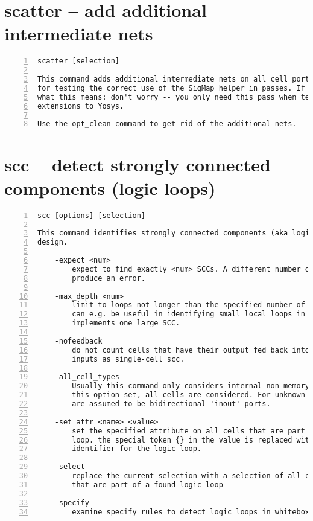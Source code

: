 \section{scatter -- add additional intermediate nets}
\label{cmd:scatter}
\begin{lstlisting}[numbers=left,frame=single]
    scatter [selection]

This command adds additional intermediate nets on all cell ports. This is used
for testing the correct use of the SigMap helper in passes. If you don't know
what this means: don't worry -- you only need this pass when testing your own
extensions to Yosys.

Use the opt_clean command to get rid of the additional nets.
\end{lstlisting}

\section{scc -- detect strongly connected components (logic loops)}
\label{cmd:scc}
\begin{lstlisting}[numbers=left,frame=single]
    scc [options] [selection]

This command identifies strongly connected components (aka logic loops) in the
design.

    -expect <num>
        expect to find exactly <num> SCCs. A different number of SCCs will
        produce an error.

    -max_depth <num>
        limit to loops not longer than the specified number of cells. This
        can e.g. be useful in identifying small local loops in a module that
        implements one large SCC.

    -nofeedback
        do not count cells that have their output fed back into one of their
        inputs as single-cell scc.

    -all_cell_types
        Usually this command only considers internal non-memory cells. With
        this option set, all cells are considered. For unknown cells all ports
        are assumed to be bidirectional 'inout' ports.

    -set_attr <name> <value>
        set the specified attribute on all cells that are part of a logic
        loop. the special token {} in the value is replaced with a unique
        identifier for the logic loop.

    -select
        replace the current selection with a selection of all cells and wires
        that are part of a found logic loop

    -specify
        examine specify rules to detect logic loops in whitebox/blackbox cells
\end{lstlisting}

